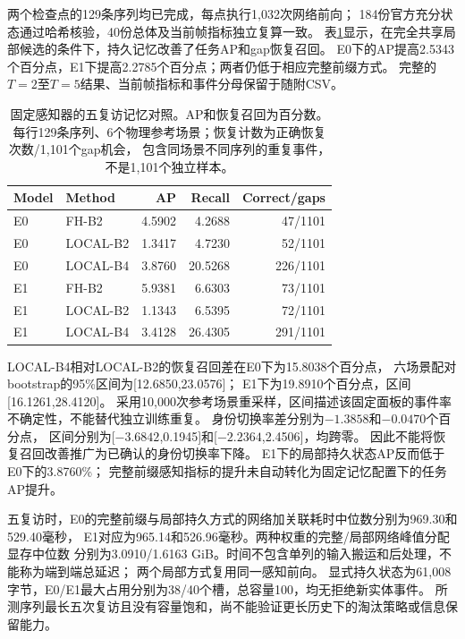 两个检查点的129条序列均已完成，每点执行1,032次网络前向；
184份官方充分状态通过哈希核验，40份总体及当前帧指标独立复算一致。
表\ref{tab:trained-memory}显示，在完全共享局部候选的条件下，持久记忆改善了任务AP和gap恢复召回。
E0下的AP提高2.5343个百分点，E1下提高2.2785个百分点；两者仍低于相应完整前缀方式。
完整的$T=2$至$T=5$结果、当前帧指标和事件分母保留于随附CSV。

\begin{table}[t]
\centering
\small
\setlength{\tabcolsep}{3pt}
\caption{固定感知器的五复访记忆对照。AP和恢复召回为百分数。
每行129条序列、6个物理参考场景；恢复计数为正确恢复次数/1,101个gap机会，
包含同场景不同序列的重复事件，不是1,101个独立样本。}
\label{tab:trained-memory}
\begin{tabular}{llrrr}
\toprule
Model & Method & AP & Recall & Correct/gaps\\
\midrule
E0 & FH-B2 & 4.5902 & 4.2688 & 47/1101\\
E0 & LOCAL-B2 & 1.3417 & 4.7230 & 52/1101\\
E0 & LOCAL-B4 & 3.8760 & 20.5268 & 226/1101\\
\midrule
E1 & FH-B2 & 5.9381 & 6.6303 & 73/1101\\
E1 & LOCAL-B2 & 1.1343 & 6.5395 & 72/1101\\
E1 & LOCAL-B4 & 3.4128 & 26.4305 & 291/1101\\
\bottomrule
\end{tabular}
\end{table}

LOCAL-B4相对LOCAL-B2的恢复召回差在E0下为15.8038个百分点，
六场景配对bootstrap的95\%区间为[12.6850,23.0576]；
E1下为19.8910个百分点，区间[16.1261,28.4120]。
采用10,000次参考场景重采样，区间描述该固定面板的事件率不确定性，不能替代独立训练重复。
身份切换率差分别为$-1.3858$和$-0.0470$个百分点，
区间分别为[$-3.6842$,0.1945]和[$-2.2364$,2.4506]，均跨零。
因此不能将恢复召回改善推广为已确认的身份切换率下降。
E1下的局部持久状态AP反而低于E0下的3.8760\%；
完整前缀感知指标的提升未自动转化为固定记忆配置下的任务AP提升。

五复访时，E0的完整前缀与局部持久方式的网络加关联耗时中位数分别为969.30和529.40毫秒，
E1对应为965.14和526.96毫秒。两种权重的完整/局部网络峰值分配显存中位数
分别为3.0910/1.6163 GiB。时间不包含单列的输入搬运和后处理，不能称为端到端总延迟；
两个局部方式复用同一感知前向。
显式持久状态为61,008字节，E0/E1最大占用分别为38/40个槽，总容量100，均无拒绝新实体事件。
所测序列最长五次复访且没有容量饱和，尚不能验证更长历史下的淘汰策略或信息保留能力。
